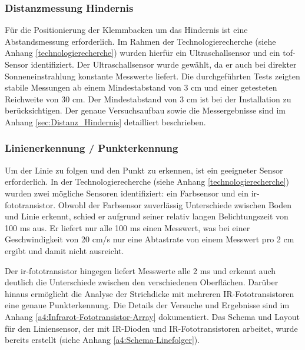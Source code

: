 \documentclass[../main.tex]{subfiles}
\begin{document}
\subsubsection{Distanzmessung Hindernis}
Für die Positionierung der Klemmbacken um das Hindernis ist eine Abstandsmessung erforderlich. Im Rahmen der Technologierecherche (siehe Anhang \ref{technologierecherche}) wurden hierfür ein Ultraschallsensor und ein \acrshort{tof}-Sensor identifiziert. Der Ultraschallsensor wurde gewählt, da er auch bei direkter Sonneneinstrahlung konstante Messwerte liefert. Die durchgeführten Tests zeigten stabile Messungen ab einem Mindestabstand von 3 cm und einer getesteten Reichweite von 30 cm. Der Mindestabstand von 3 cm ist bei der Installation zu berücksichtigen. Der genaue Versuchsaufbau sowie die Messergebnisse sind im Anhang \ref{sec:Distanz_Hindernis} detailliert beschrieben.

\newpage

\subsubsection{Linienerkennung / Punkterkennung}
Um der Linie zu folgen und den Punkt zu erkennen, ist ein geeigneter Sensor erforderlich. In der Technologierecherche (siehe Anhang \ref{technologierecherche}) wurden zwei mögliche Sensoren identifiziert: ein Farbsensor und ein \gls{ir-fototransistor}. Obwohl der Farbsensor zuverlässig Unterschiede zwischen Boden und Linie erkennt, schied er aufgrund seiner relativ langen Belichtungszeit von 100 ms aus. Er liefert nur alle 100 ms einen Messwert, was bei einer Geschwindigkeit von 20 cm/s nur eine Abtastrate von einem Messwert pro 2 cm ergibt und damit nicht ausreicht.

Der \gls{ir-fototransistor} hingegen liefert Messwerte alle 2 ms und erkennt auch deutlich die Unterschiede zwischen den verschiedenen Oberflächen. Darüber hinaus ermöglicht die Analyse der Strichdicke mit mehreren IR-Fototransistoren eine genaue Punkterkennung. Die Details der Versuche und Ergebnisse sind im Anhang \ref{a4:Infrarot-Fototransistor-Array} dokumentiert.
Das Schema und Layout für den Liniensensor, der mit IR-Dioden und IR-Fototransistoren arbeitet, wurde bereits erstellt (siehe Anhang \ref{a4:Schema-Linefolger}).
\end{document}
